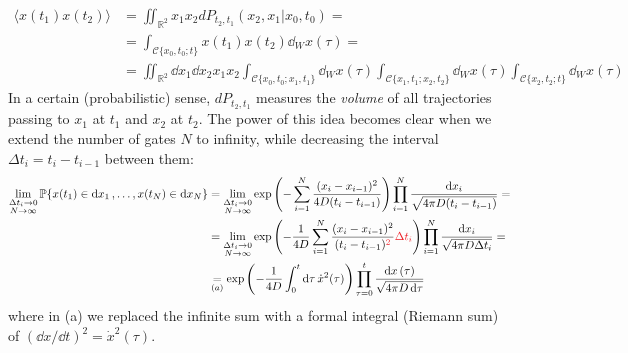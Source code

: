\documentclass[../template.tex]{subfiles}
\begin{document}
\begin{align*}
    \langle x(t_1) x(t_2) \rangle &= \iint_{\mathbb{R}^2} x_1 x_2 dP_{t_2,t_1}(x_2,x_1|x_0,t_0) =\\
    &= \int_{\mathcal{C}\{x_0,t_0;t\}} x(t_1) x(t_2 )\dd{_Wx(\tau)} =\\
    &= \iint_{\mathbb{R}^2} \dd{x_1} \dd{x_2} x_1 x_2 \int_{\mathcal{C}\{x_0,t_0;x_1,t_1\}} \dd{_Wx(\tau)} \int_{\mathcal{C}\{x_1,t_1;x_2,t_2\}} \dd{_Wx(\tau)} \int_{\mathcal{C}\{x_2,t_2;t\}} \dd{_Wx(\tau)}
\end{align*}
In a certain (probabilistic) sense, $dP_{t_2,t_1}$ measures the \textit{volume} of all trajectories passing  to $x_1$ at $t_1$ and $x_2$ at $t_2$. The power of this idea becomes clear when we extend the number of gates $N$ to infinity, while decreasing the interval $\Delta t_i = t_i - t_{i-1}$ between them:
\begin{align*}
    \lim_{\substack{\Delta t_i \to 0\\ N \to \infty}} \mathbb{P}\{x(t_1) \in \dd{x_1}, \dots, x(t_N) \in \dd{x_N}\} &=\lim_{\substack{\Delta t_i \to 0\\ N \to \infty}} \exp\left(-\sum_{i=1}^N \frac{(x_i - x_{i-1})^2}{4 D (t_i - t_{i-1})} \right) \prod_{i=1}^N \frac{\dd{x_i}}{\sqrt{4 \pi D (t_i - t_{i-1})}} =\\
    &= \lim_{\substack{\Delta t_i \to 0 \\ N \to \infty}} \exp\left(-\frac{1}{4 D} \sum_{i=1}^{N} \frac{(x_i - x_{i-1})^2}{(t_i - t_{i-1})^{\textcolor{Red}{2}}} \textcolor{Red}{\Delta t_i} \right) \prod_{i=1}^N \frac{\dd{x_i}}{\sqrt{4 \pi D \Delta t_i}} = \\
    &\underset{(a)}{=}  \exp\left(-\frac{1}{4D} \int_0^t \dd{\tau} \dot{x}^2 (\tau)\right) \prod_{\tau=0}^t \frac{\dd{x}(\tau)}{\sqrt{4 \pi D \dd{\tau}}}  
\end{align*}      
where in (a) we replaced the infinite  sum with a formal integral (Riemann sum) of $(\dd{x}/\dd{t})^2 = \dot{x}^2(\tau)$. 
\end{document}
